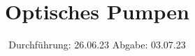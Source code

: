 

\subject{V21}
\title{Optisches Pumpen}
\date{
  Durchführung: 26.06.23
  \hspace{3em}
  Abgabe: 03.07.23
}



\maketitle
\thispagestyle{empty}
\tableofcontents
\newpage








\newpage
\printbibliography{}
\nocite{matplotlib}
\nocite{numpy}
\nocite{scipy}
\nocite{uncertainties}
\nocite{reback2020pandas}

\newpage




